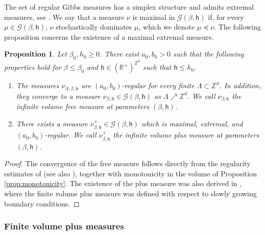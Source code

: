 \documentclass[11pt,a4paper]{article}
\numberwithin{equation}{section}
\theoremstyle{plain}
\newtheorem{Prop}[Thm]{Proposition}
\theoremstyle{definition}
\begin{document}
The set of regular Gibbs measures has a simplex structure and admits extremal measures, see \cite{LebowitzPresutti1976, GunaratnamPanagiotisPanisSeveroPhi42022,PV26}. We say that a measure $\nu$ is maximal in $\mathcal G(\beta,\mathsf{h})$ if, for every $\mu \in \mathcal G(\beta,\mathsf{h})$, $\nu$ stochastically dominates $\mu$, which we denote $\mu \preccurlyeq \nu$. The following proposition concerns the existence of a maximal extremal measure.

\begin{Prop}\label{prop: existence of plus state extremal}
Let $\beta_0,h_0\geq 0$. There exist $a_0,b_0>0$ such that the following properties hold for $\beta\leq \beta_0$ and $\mathsf{h}\in (\mathbb R^+)^{\mathbb Z^d}$ such that $\mathsf{h}\leq h_0$. 
\begin{enumerate}
    \item[$(i)$] The measures $\nu_{\Lambda, \beta,\mathsf{h}}$ are $(a_0,b_0)$-regular for every finite $\Lambda\subset \mathbb Z^d$. In addition, they converge to a measure $\nu_{\beta,\mathsf{h}}\in \mathcal{G}(\beta,\mathsf{h})$ as $\Lambda\nearrow \mathbb Z^d$. We call $\nu_{\beta,\mathsf h}$ the infinite volume free measure at parameters $(\beta, \mathsf h)$.
    \item[$(ii)$] There exists a measure $\nu^+_{\beta,\mathsf{h}} \in \mathcal{G}(\beta,\mathsf{h})$ which is maximal, extremal, and $(a_0,b_0)$-regular. We call $\nu^+_{\beta,\mathsf{h}}$ the infinite volume plus measure at parameters $(\beta,\mathsf{h})$.
\end{enumerate}
\end{Prop}

\begin{proof}
The convergence of the free measure follows directly from the regularity estimates of \cite{LebowitzPresutti1976} (see also \cite{GunaratnamPanagiotisPanisSeveroPhi42022,PV26}), together with monotonicity in the volume of Proposition \ref{prop:monotonicity}. The existence of the plus measure was also derived in \cite{LebowitzPresutti1976}, where the finite volume plus measure was defined with respect to slowly growing boundary conditions. 
\end{proof}


\subsubsection{Finite volume plus measures}\label{sec:plus_measure}
\end{document}
